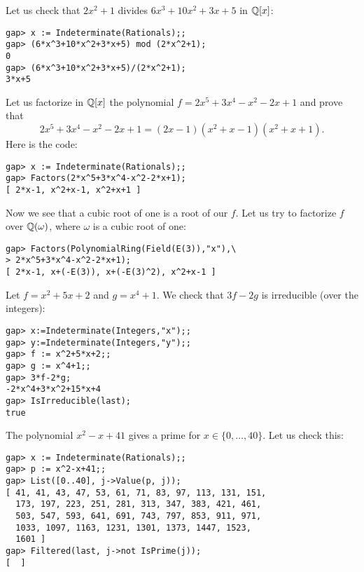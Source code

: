 \begin{example}
Let us check that $2x^2+1$ divides $6x^3+10x^2+3x+5$ in $\mathbb{Q}[x]$:
\begin{lstlisting}
gap> x := Indeterminate(Rationals);;
gap> (6*x^3+10*x^2+3*x+5) mod (2*x^2+1);
0
gap> (6*x^3+10*x^2+3*x+5)/(2*x^2+1);
3*x+5
\end{lstlisting}
\end{example}

\begin{example}
	Let us factorize in $\mathbb{Q}[x]$ the polynomial
	$f=2x^5+3x^4-x^2-2x+1$ and prove that 
	\[
	2x^5+3x^4-x^2-2x+1=(2x-1)(x^2+x-1)(x^2+x+1).
	\]
	Here is the code:
\begin{lstlisting}
gap> x := Indeterminate(Rationals);;
gap> Factors(2*x^5+3*x^4-x^2-2*x+1);
[ 2*x-1, x^2+x-1, x^2+x+1 ]
\end{lstlisting}
Now we see that a cubic root of one is a root of our $f$. Let us try to
factorize $f$ over $\mathbb{Q}(\omega)$, where $\omega$ is a cubic root of one:
\begin{lstlisting}
gap> Factors(PolynomialRing(Field(E(3)),"x"),\
> 2*x^5+3*x^4-x^2-2*x+1);
[ 2*x-1, x+(-E(3)), x+(-E(3)^2), x^2+x-1 ]
\end{lstlisting}
\end{example}

\begin{example}
	Let $f=x^2+5x+2$ and $g=x^4+1$. We check that $3f-2g$ is irreducible (over
	the integers): 
\begin{lstlisting}
gap> x:=Indeterminate(Integers,"x");;
gap> y:=Indeterminate(Integers,"y");;
gap> f := x^2+5*x+2;;
gap> g := x^4+1;;
gap> 3*f-2*g;
-2*x^4+3*x^2+15*x+4
gap> IsIrreducible(last);
true
\end{lstlisting}
\end{example}
\begin{example}
	\label{example:primes}
	The polynomial $x^2-x+41$ gives a prime for $x\in\{0,\dots,40\}$. Let us
	check this:
\begin{lstlisting}
gap> x := Indeterminate(Rationals);;
gap> p := x^2-x+41;;
gap> List([0..40], j->Value(p, j));
[ 41, 41, 43, 47, 53, 61, 71, 83, 97, 113, 131, 151, 
  173, 197, 223, 251, 281, 313, 347, 383, 421, 461, 
  503, 547, 593, 641, 691, 743, 797, 853, 911, 971, 
  1033, 1097, 1163, 1231, 1301, 1373, 1447, 1523, 
  1601 ]
gap> Filtered(last, j->not IsPrime(j));
[  ]
\end{lstlisting}
\end{example}


